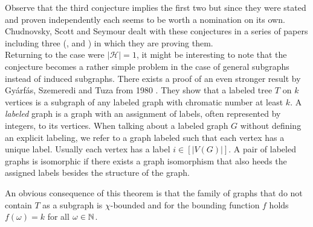Observe that the third conjecture implies the first two but since they were stated and proven independently each seems to be worth a nomination on its own. Chudnovsky, Scott and Seymour dealt with these conjectures in a series of papers including three (\cite{SS14}, \cite{CSS15} and \cite{CSSS17}) in which they are proving them.
\\

Returning to the case were $\vert\mathcal{H}\vert =1$, it might be interesting to note that the conjecture becomes a rather simple problem in the case of general subgraphs instead of induced subgraphs. There exists a proof of an even stronger result by Gyárfás, Szemeredi and Tuza from 1980 \cite{GST80}. They show that a labeled tree $T$ on $k$ vertices is a subgraph of any labeled graph with chromatic number at least $k$. A \textit{labeled} graph is a graph with an assignment of labels, often represented by integers, to its vertices. When talking about a labeled graph $G$ without defining an explicit labeling, we refer to a graph labeled such that each vertex has a unique label. Usually each vertex has a label $i\in [\vert V(G)\vert ]$. A pair of labeled graphs is isomorphic if there exists a graph isomorphism that also heeds the assigned labels besides the structure of the graph.

An obvious consequence of this theorem is that the family of graphs that do not contain $T$ as a subgraph is $\chi$-bounded and for the bounding function $f$ holds $f(\omega )= k$ for all $\omega\in\mathbb{N}$.


